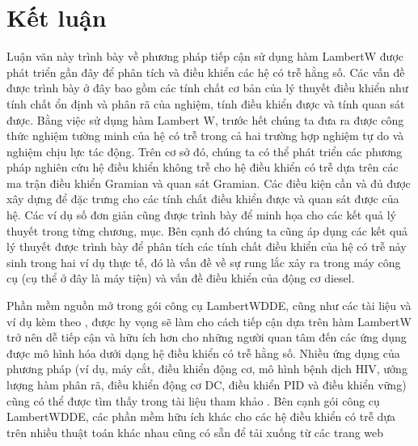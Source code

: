 \chapter{Kết luận}
\setlength{\parindent}{6.5ex}

Luận văn này trình bày về phương pháp tiếp cận sử dụng hàm LambertW được phát triển gần đây để phân tích và điều khiển các hệ có trễ hằng số. 
Các vấn đề được trình bày ở đây bao gồm các tính chất cơ bản của lý thuyết điều khiển như tính chất ổn định và phân rã của nghiệm, tính điều khiển được và tính quan sát được. Bằng việc sử dụng hàm Lambert W, trước hết chúng ta đưa ra được công thức nghiệm tường minh của hệ có trễ trong cả hai trường hợp nghiệm tự do và nghiệm chịu lực tác động. 
%
Trên cơ sở đó, chúng ta có thể phát triển các phương pháp nghiên cứu hệ điều khiển không trễ cho hệ điều khiển có trễ dựa trên các ma trận điều khiển Gramian và quan sát Gramian. Các điều kiện cần và đủ được xây dựng để
đặc trưng cho các tính chất điều khiển được và quan sát được của hệ.
Các ví dụ số đơn giản cũng được trình bày để minh họa cho các kết quả lý thuyết trong từng chương, mục. 
%
Bên cạnh đó chúng ta cũng áp dụng các kết quả lý thuyết được trình bày để phân tích các tính chất điều khiển của hệ có trễ nảy sinh trong hai ví dụ thực tế, đó là vấn đề về sự rung lắc xảy ra trong máy công cụ (cụ thể ở đây là máy tiện) và vấn đề điều khiển của động cơ diesel. 

Phần mềm nguồn mở trong gói công cụ LambertWDDE, cũng như các tài liệu và ví dụ kèm theo \cite{Dua10}, được hy vọng sẽ làm cho cách tiếp cận dựa trên hàm LambertW trở nên dễ tiếp cận và hữu ích hơn cho những người quan tâm đến các ứng dụng được mô hình hóa dưới dạng hệ điều khiển có trễ hằng số.
Nhiều ứng dụng của phương pháp (ví dụ, máy cắt, điều khiển động cơ, mô hình bệnh dịch HIV, ướng lượng hàm  phân rã, điều khiển động cơ DC, điều khiển PID và điều khiển vững) cũng có thể được tìm thấy trong tài liệu tham khảo \cite{Du12,Yi13, Yi07, Yi08, YiOc08, YiEig10,Yi10} . Bên cạnh gói công cụ LambertWDDE, các phần mềm hữu ích khác cho các hệ điều khiển có trễ dựa trên nhiều thuật toán khác nhau cũng có sẵn để tải xuống từ các trang web \cite{Bre09, Eng01, Vyh09}
